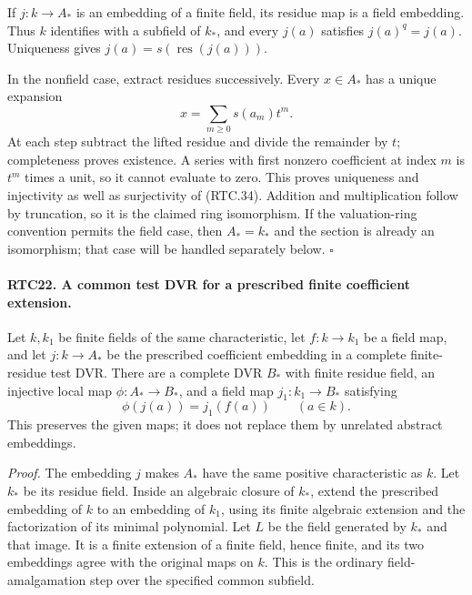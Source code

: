 \documentclass[11pt,a4paper]{article}
\numberwithin{equation}{section}
\theoremstyle{remark}\newtheorem{remark}[theorem]{Remark}
\begin{document}
If \(j:k\to A_*\) is an embedding of a finite field, its
residue map is a field embedding.  Thus \(k\) identifies with
a subfield of \(k_*\), and every \(j(a)\) satisfies
\(j(a)^q=j(a)\).  Uniqueness gives
\(j(a)=s(\operatorname{res}(j(a)))\).

In the nonfield case, extract residues successively.  Every
\(x\in A_*\) has a unique expansion
\[
 x=\sum_{m\geq0}s(a_m)t^m.
                                                        \tag{RTC.35}
\]
At each step subtract the lifted residue and divide the remainder
by \(t\); completeness proves existence.  A series with first
nonzero coefficient at index \(m\) is \(t^m\) times a unit,
so it cannot evaluate to zero.  This proves uniqueness and
injectivity as well as surjectivity of (RTC.34).  Addition and
multiplication follow by truncation, so it is the claimed ring
isomorphism.  If the valuation-ring convention permits the field
case, then \(A_*=k_*\) and the section is already an isomorphism;
that case will be handled separately below. \hfill\(\square\)

\paragraph{RTC22. A common test DVR for a prescribed finite coefficient extension.}
\label{claim:RTC22}
Let \(k,k_1\) be finite fields of the same characteristic,
let \(f:k\to k_1\) be a field map, and let \(j:k\to A_*\)
be the prescribed coefficient embedding in a complete finite-residue
test DVR.  There are a complete DVR \(B_*\) with finite residue
field, an injective local map \(\phi:A_*\to B_*\), and a
field map \(j_1:k_1\to B_*\) satisfying
\[
       \phi(j(a))=j_1(f(a))\qquad(a\in k).
                                                        \tag{RTC.36}
\]
This preserves the given maps; it does not replace them by
unrelated abstract embeddings.

\emph{Proof.}
The embedding \(j\) makes \(A_*\) have the same positive
characteristic as \(k\).  Let \(k_*\) be its residue field.
Inside an algebraic closure of \(k_*\), extend the prescribed
embedding of \(k\) to an embedding of \(k_1\), using its
finite algebraic extension and the factorization of its minimal
polynomial.  Let \(L\) be the field generated by \(k_*\) and
that image.  It is a finite extension of a finite field, hence
finite, and its two embeddings agree with the original maps on
\(k\).  This is the ordinary field-amalgamation step over the
specified common subfield.
\end{document}
